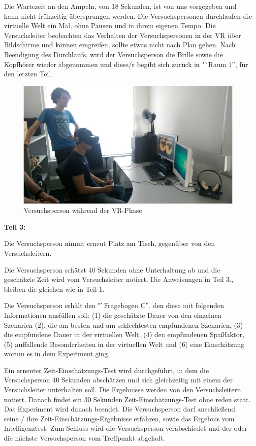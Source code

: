 \documentclass{Bericht}
\begin{document}
Die Wartezeit an den Ampeln, von 18 Sekunden, ist von uns vorgegeben und kann nicht frühzeitig übersprungen werden. Die Versuchspersonen durchlaufen die virtuelle Welt ein Mal, ohne Pausen und in ihrem eigenen Tempo. Die Versuchsleiter beobachten das Verhalten der Versuchspersonen in der VR über Bildschirme und können eingreifen, sollte etwas nicht nach Plan gehen. Nach Beendigung des Durchlaufs, wird der Versuchsperson die Brille sowie die Kopfhörer wieder abgenommen und diese/r begibt sich zurück in "`Raum 1'', für den letzten Teil.

\begin{figure}[H]
	\centering    
	\includegraphics[height=\textheight, width=\linewidth, keepaspectratio]{../Bilder/v.jpg}
	\caption{Versuchsperson während der VR-Phase}
	\label{img:versuchsperson-in-vr}
\end{figure}

\textbf{Teil 3:}

Die Versuchsperson nimmt erneut Platz am Tisch, gegenüber von den Versuchsleitern. 

Die Versuchsperson schätzt 40 Sekunden ohne Unterhaltung ab und die geschätzte Zeit wird vom Versuchsleiter notiert. Die Anweisungen in Teil 3., bleiben die gleichen wie in Teil 1.

Die Versuchsperson erhält den "`Fragebogen C'', den diese mit folgenden Informationen ausfüllen soll:  (1) die geschätzte Dauer von den einzelnen Szenarien (2), die am besten und am schlechtesten empfundenen Szenarien, (3) die empfundene Dauer in der virtuellen Welt, (4) den empfundenen Spaßfaktor, (5) auffallende Besonderheiten in der virtuellen Welt und (6) eine Einschätzung worum es in dem Experiment ging.

Ein erneuter Zeit-Einschätzungs-Test wird durchgeführt, in dem die Versuchsperson 40 Sekunden abschätzen und sich gleichzeitig mit einem der Versuchsleiter unterhalten soll. Die Ergebnisse werden von den Versuchsleitern notiert. Danach findet ein 30 Sekunden Zeit-Einschätzungs-Test ohne reden statt. Das Experiment wird danach beendet. Die Versuchsperson darf anschließend seine / ihre Zeit-Einschätzungs-Ergebnisse erfahren, sowie das Ergebnis vom Intelligenztest. Zum Schluss wird die Versuchsperson verabschiedet und der oder die nächste Versuchsperson vom Treffpunkt abgeholt.
\end{document}
